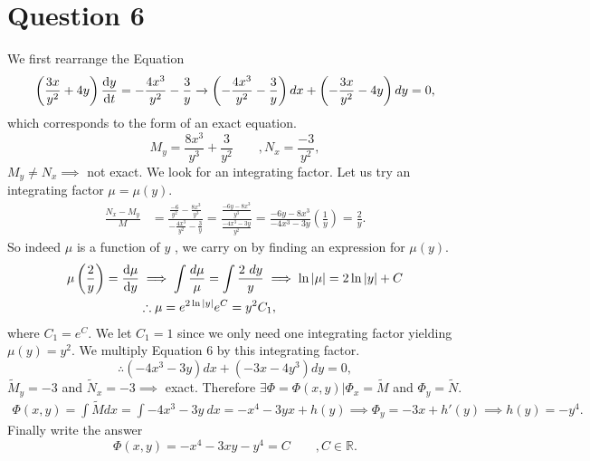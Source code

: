 \documentclass[
	12pt,
	]{article}
\newcommand{\R}{\mathbb{R}}
\theoremstyle{definition}
\theoremstyle{definition}
\theoremstyle{definition}
\theoremstyle{definition}
\theoremstyle{definition}
\theoremstyle{example}
\theoremstyle{note}
\theoremstyle{remark}
\theoremstyle{example}
\begin{document}
			\section*{Question 6}
				We first rearrange the Equation
				\begin{equation} 
				\left(\frac{3x}{y^{2}} + 4y\right)\dv{y}{t} = -\frac{4x^{3}}{y^{2}} -\frac{3}{y} \xrightarrow{} \left(-\frac{4x^{3}}{y^{2}} - \frac{3}{y}\right) dx + \left(-\frac{3x}{y^{2}} - 4y\right)dy = 0,
				\end{equation}
				which corresponds to the form of an exact equation.
				$$ M_{y} = \frac{8x^{3}}{y^{3}} + \frac{3}{y^{2}} \qquad, N_{x} = \frac{-3}{y^{2}},$$
				$M_{y} \neq N_{x} \implies$ not exact. We look for an integrating factor. Let us try an integrating factor $\mu = \mu(y)$.
				\begin{align*}
					\frac{N_{x} - M_{y}}{M} &= \frac{\frac{-6}{y^{2}} - \frac{8x^{3}}{y^{3}}}{-\frac{4x^{3}}{y^{2}} - \frac{3}{y}} = \frac{\frac{-6y - 8x^{3}}{y^{3}}}{\frac{-4x^{3}-3y}{y^{2}}}= \frac{-6y-8x^{3}}{-4x^{3}-3y} \left(\frac{1}{y}\right) = \frac{2}{y}.
				\end{align*}
				So indeed $\mu$ is a function of $y$ , we carry on by finding an expression for $\mu(y)$.
				\begin{align*}
					\mu\left(\frac{2}{y}\right) =\dv{\mu}{y} &\implies \int \frac{d\mu}{\mu} = \int \frac{2 \ dy}{y} \implies \ln\abs{\mu} = 2\ln\abs{y}+ C \\
					&\therefore \mu = e^{2\ln\abs{y}}e^{C} = y^{2}C_{1},
				\end{align*}
				where $C_{1} = e^{C}$. We let $C_{1} =1$ since we only need one integrating factor yielding $\mu(y) = y^{2}$. We multiply Equation 6 by this integrating factor.
				$$ \therefore (-4x^{3}-3y)dx + (-3x -4y^{3})dy = 0,$$
				$\widetilde{M}_{y} =-3$ and $\widetilde{N}_{x} = -3 \implies $ exact. Therefore $\exists \Phi = \Phi(x,y) | \Phi_{x} = \widetilde{M}$ and $\Phi_{y} = \widetilde{N}$.
				\begin{gather*}
					\Phi(x,y) = \int \widetilde{M} dx = \int -4x^{3} -3y \ dx = -x^{4}- 3yx + h(y) \implies \Phi_{y} = -3x + h'(y) \implies h(y) = -y^{4}.
				\end{gather*}
				Finally write the answer 
				$$ \Phi (x,y) = -x^{4} -3xy - y^{4} = C \qquad, C \in \R.$$
				
\end{document}
